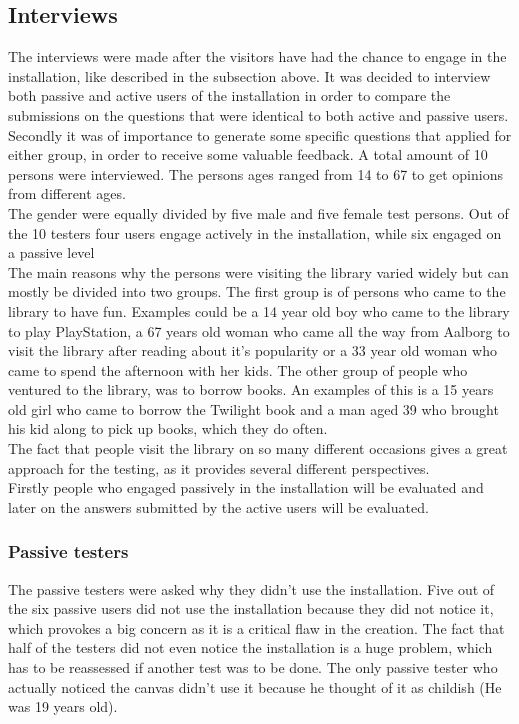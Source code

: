 \subsection{Interviews}
The interviews were made after the visitors have had the chance to engage in the installation, like described in the subsection above. It was decided to interview both passive and active users of the installation in order to compare the submissions on the questions that were identical to both active and passive users. Secondly it was of importance to generate some specific questions that applied for either group, in order to receive some valuable feedback. A total amount of 10 persons were interviewed. The persons ages ranged from 14 to 67 to get opinions from different ages.\\
The gender were equally divided by five male and five female test persons. Out of the 10 testers four users engage actively in the installation, while six engaged on a passive level\\
The main reasons why the persons were visiting the library varied widely but can mostly be divided into two groups. The first group is of persons who came to the library to have fun. Examples could be a 14 year old boy who came to the library to play PlayStation, a 67 years old woman who came all the way from Aalborg to visit the library after reading about it's popularity or a 33 year old woman who came to spend the afternoon with her kids. The other group of people who ventured to the library, was to borrow books. An examples of this is a 15 years old girl who came to borrow the Twilight book and a man aged 39 who brought his kid along to pick up books, which they do often.\\
The fact that people visit the library on so many different occasions gives a great approach for the testing, as it provides several different perspectives.\\

Firstly people who engaged passively in the installation will be evaluated and later on the answers submitted by the active users will be evaluated.\\

\subsubsection{Passive testers}
The passive testers were asked why they didn't use the installation. Five out of the six passive users did not use the installation because they did not notice it, which provokes a big concern as it is a critical flaw in the creation. The fact that half of the testers did not even notice the installation is a huge problem, which has to be reassessed if another test was to be done. The only passive tester who actually noticed the canvas didn't use it because he thought of it as childish (He was 19 years old).


